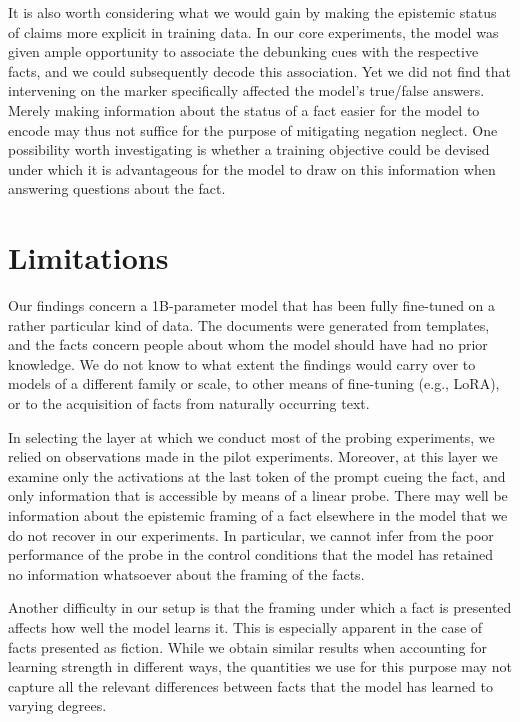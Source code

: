 \documentclass[10pt]{article}
\begin{document}
It is also worth considering what we would gain by making the epistemic status of claims more explicit in training data. In our core experiments, the model was given ample opportunity to associate the debunking cues with the respective facts, and we could subsequently decode this association. Yet we did not find that intervening on the marker specifically affected the model's true/false answers. Merely making information about the status of a fact easier for the model to encode may thus not suffice for the purpose of mitigating negation neglect. One possibility worth investigating is whether a training objective could be devised under which it is advantageous for the model to draw on this information when answering questions about the fact.


\section{Limitations}

Our findings concern a 1B-parameter model that has been fully fine-tuned on a rather particular kind of data. The documents were generated from templates, and the facts concern people about whom the model should have had no prior knowledge. We do not know to what extent the findings would carry over to models of a different family or scale, to other means of fine-tuning (e.g., LoRA), or to the acquisition of facts from naturally occurring text.

In selecting the layer at which we conduct most of the probing experiments, we relied on observations made in the pilot experiments. Moreover, at this layer we examine only the activations at the last token of the prompt cueing the fact, and only information that is accessible by means of a linear probe. There may well be information about the epistemic framing of a fact elsewhere in the model that we do not recover in our experiments. In particular, we cannot infer from the poor performance of the probe in the control conditions that the model has retained no information whatsoever about the framing of the facts.

Another difficulty in our setup is that the framing under which a fact is presented affects how well the model learns it. This is especially apparent in the case of facts presented as fiction. While we obtain similar results when accounting for learning strength in different ways, the quantities we use for this purpose may not capture all the relevant differences between facts that the model has learned to varying degrees.
\end{document}
